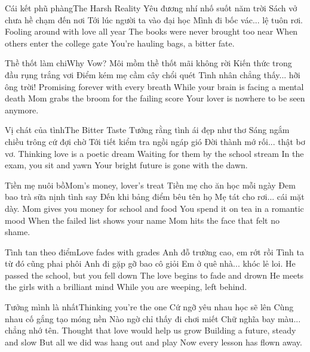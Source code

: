 \begin{tutuyetbox}{Cái kết phũ phàng}{The Harsh Reality}
Yêu đương nhí nhố suốt năm trời
Sách vở chưa hề chạm đến nơi
Tới lúc người ta vào đại học
Mình đi bốc vác... lệ tuôn rơi.
\tcblower
Fooling around with love all year
The books were never brought too near
When others enter the college gate
You're hauling bags, a bitter fate.
\end{tutuyetbox}

\begin{tutuyetbox}{Thề thốt làm chi}{Why Vow?}
Môi mồm thề thốt mãi không rời
Kiến thức trong đầu rụng trắng vơi
Điểm kém mẹ cầm cây chổi quét
Tình nhân chẳng thấy... hỡi ông trời!
\tcblower
Promising forever with every breath
While your brain is facing a mental death
Mom grabs the broom for the failing score
Your lover is nowhere to be seen anymore.
\end{tutuyetbox}

\begin{tutuyetbox}{Vị chát của tình}{The Bitter Taste}
Tưởng rằng tình ái đẹp như thơ
Sáng ngắm chiều trông cứ đợi chờ
Tới tiết kiểm tra ngồi ngáp gió
Đời thành mớ rối... thật bơ vơ.
\tcblower
Thinking love is a poetic dream
Waiting for them by the school stream
In the exam, you sit and yawn
Your bright future is gone with the dawn.
\end{tutuyetbox}

\begin{tutuyetbox}{Tiền mẹ nuôi bồ}{Mom's money, lover's treat}
Tiền mẹ cho ăn học mỗi ngày
Đem bao trà sữa nịnh tình say
Đến khi bảng điểm bêu tên họ
Mẹ tát cho rơi... cái mặt dày.
\tcblower
Mom gives you money for school and food
You spend it on tea in a romantic mood
When the failed list shows your name
Mom hits the face that felt no shame.
\end{tutuyetbox}

\begin{tutuyetbox}{Tình tan theo điểm}{Love fades with grades}
Anh đỗ trường cao, em rớt rồi
Tình ta từ đó cũng phai phôi
Anh đi gặp gỡ bao cô giỏi
Em ở quê nhà... khóc lẻ loi.
\tcblower
He passed the school, but you fell down
The love begins to fade and drown
He meets the girls with a brilliant mind
While you are weeping, left behind.
\end{tutuyetbox}

\begin{tutuyetbox}{Tưởng mình là nhất}{Thinking you're the one}
Cứ ngỡ yêu nhau học sẽ lên
Cùng nhau cố gắng tạo móng nền
Nào ngờ chỉ thấy đi chơi miết
Chữ nghĩa bay màu... chẳng nhớ tên.
\tcblower
Thought that love would help us grow
Building a future, steady and slow
But all we did was hang out and play
Now every lesson has flown away.
\end{tutuyetbox}

